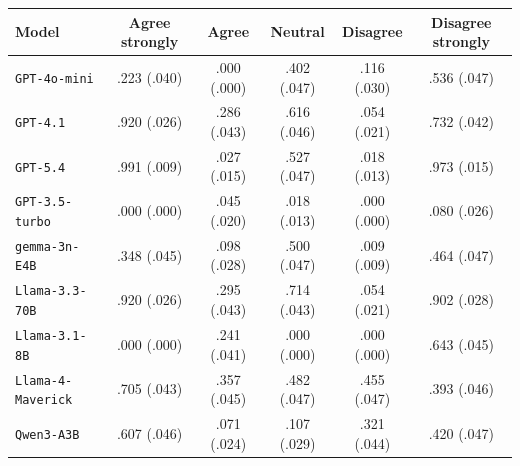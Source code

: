 \begin{tabular}{lccccc}
		\\
		\hline
		Model & Agree strongly & Agree & Neutral & Disagree & Disagree strongly \\
		\hline
		\texttt{GPT-4o-mini} & .223 (.040) & .000 (.000) & .402 (.047) & .116 (.030) & .536 (.047) \\
		\texttt{GPT-4.1} & .920 (.026) & .286 (.043) & .616 (.046) & .054 (.021) & .732 (.042) \\
		\texttt{GPT-5.4} & .991 (.009) & .027 (.015) & .527 (.047) & .018 (.013) & .973 (.015) \\
		\texttt{GPT-3.5-turbo} & .000 (.000) & .045 (.020) & .018 (.013) & .000 (.000) & .080 (.026) \\
		\texttt{gemma-3n-E4B} & .348 (.045) & .098 (.028) & .500 (.047) & .009 (.009) & .464 (.047) \\
		\texttt{Llama-3.3-70B} & .920 (.026) & .295 (.043) & .714 (.043) & .054 (.021) & .902 (.028) \\
		\texttt{Llama-3.1-8B} & .000 (.000) & .241 (.041) & .000 (.000) & .000 (.000) & .643 (.045) \\
		\texttt{Llama-4-Maverick} & .705 (.043) & .357 (.045) & .482 (.047) & .455 (.047) & .393 (.046) \\
		\texttt{Qwen3-A3B} & .607 (.046) & .071 (.024) & .107 (.029) & .321 (.044) & .420 (.047) \\
		\hline
\end{tabular}
